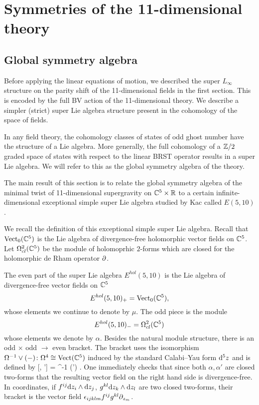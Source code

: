 \documentclass[11pt]{amsart}
\begin{document}
\section{Symmetries of the 11-dimensional theory}
\label{sec:symmetry}

\subsection{Global symmetry algebra}
\label{sec:global}

Before applying the linear equations of motion, we described the super $L_\infty$ structure on the parity shift of the 11-dimensional fields in the first section. 
This is encoded by the full BV action of the 11-dimensional theory.
We describe a simpler (strict) super Lie algebra structure present in the cohomology of the space of fields.

In any field theory, the cohomology classes of states of odd ghost number have the structure of a Lie algebra. 
More generally, the full cohomology of a $\mathbb Z/2$ graded space of states with respect to the linear BRST operator results in a super Lie algebra. 
We will refer to this as the global symmetry algebra of the theory.

The main result of this section is to relate the global symmetry algebra of the minimal twist of 11-dimensional supergravity on $\mathbb C^5 \times \mathbb R$ to a certain infinite-dimensional exceptional simple super Lie algebra studied by Kac \cite{KacClass,KR} called $E(5,10)$.

We recall the definition of this exceptional simple super Lie algebra.
Recall that ${\rm Vect}_0 (\mathbb C^5)$ is the Lie algebra of divergence-free holomorphic vector fields on $\mathbb C^5$.
Let $\Omega^{2}_{cl} (\mathbb C^5)$ be the module of holomoprhic $2$-forms which are closed for the holomorphic de Rham operator $\partial$.

The even part of the super Lie algebra $E^{hol}(5,10)$ is the Lie algebra of divergence-free vector fields on $\mathbb C^5$
\[
E^{hol}(5,10)_+ = {\rm Vect}_0(\mathbb C^5) ,
\]
whose elements we continue to denote by $\mu$. 
The odd piece is the module 
\[
E^{hol}(5,10)_- = \Omega^{2}_{cl} (\mathbb C^5) 
\]
whose elements we denote by $\alpha$. 
Besides the natural module structure, there is an odd $\times$ odd $\to$ even bracket. 
The bracket uses the isomorphism $\Omega^{-1} \vee (-) \colon \Omega^{4} \cong {\rm Vect} (\mathbb C^5)$ induced by the standard Calabi--Yau form ${\rm d}^5 z$ and is defined by
\beqn\label{eqn:e510}
[\alpha, \alpha'] = \Omega^{-1} \vee (\alpha \wedge \alpha') .
\eeqn
One immediately checks that since both $\alpha, \alpha'$ are closed two-forms that the resulting vector field on the right hand side is divergence-free. 
In coordinates, if $f^{ij} {\rm d} z_i \wedge {\rm d} z_j$, $g^{kl} {\rm d} z_k \wedge {\rm d} z_l$ are two closed two-forms, their bracket is the vector field $\epsilon_{ijklm} f^{ij}g^{kl} \partial_{z_m}$. 
\end{document}
